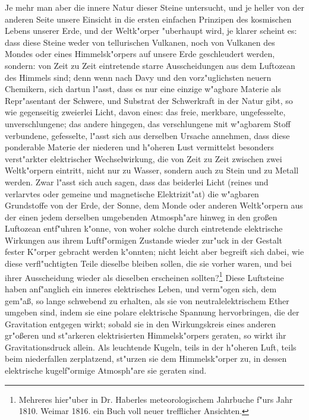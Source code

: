 \documentclass[a4paper, 11pt, oneside, polutonikogreek, german]{article}
\begin{document}
Je mehr man aber die innere Natur dieser Steine untersucht, und je heller von der anderen Seite unsere Einsicht in die ersten einfachen Prinzipen des kosmischen Lebens unserer Erde, und der Weltk"orper "uberhaupt wird, je klarer scheint es: dass diese Steine weder von tellurischen Vulkanen, noch von Vulkanen des Mondes oder eines Himmelsk"orpers auf unsere Erde geschleudert werden, sondern: von Zeit zu Zeit eintretende starre Ausscheidungen aus dem Luftozean des Himmels sind; denn wenn nach Davy und den vorz"uglichsten neuern Chemikern, sich dartun l"asst, dass es nur eine einzige w"agbare Materie als Repr"asentant der Schwere, und Substrat der Schwerkraft in der Natur gibt, so wie gegenseitig zweierlei Licht, davon eines: das freie, merkbare, ungefesselte, unverschlungene; das andere hingegen, das verschlungene mit w"agbarem Stoff verbundene, gefesselte, l"asst sich aus derselben Ursache annehmen, dass diese ponderable Materie der niederen und h"oheren Lust vermittelst besonders verst"arkter elektrischer Wechselwirkung, die von Zeit zu Zeit zwischen zwei Weltk"orpern eintritt, nicht nur zu Wasser, sondern auch zu Stein und zu Metall werden. Zwar l"asst sich auch sagen, dass das beiderlei Licht (reines und verlarvtes oder gemeine und magnetische Elektrizit"at) die w"agbaren Grundstoffe von der Erde, der Sonne, dem Monde oder anderen Weltk"orpern aus der einen jedem derselben umgebenden Atmosph"are hinweg in den großen Luftozean entf"uhren k"onne, von woher solche durch eintretende elektrische Wirkungen aus ihrem Luftf"ormigen Zustande wieder zur"uck in der Gestalt fester K"orper gebracht werden k"onnten; nicht leicht aber begreift sich dabei, wie diese verfl"uchtigten Teile dieselbe bleiben sollen, die sie vorher waren, und bei ihrer Ausscheidung wieder als dieselben erscheinen sollten?\footnote{Mehreres hier"uber in Dr. Haberles meteorologischem Jahrbuche f"urs Jahr 1810. Weimar 1816. ein Buch voll neuer trefflicher Ansichten.} Diese Luftsteine haben anf"anglich ein inneres elektrisches Leben, und verm"ogen sich, dem gem"aß, so lange schwebend zu erhalten, als sie von neutralelektrischem Ether umgeben sind, indem sie eine polare elektrische Spannung hervorbringen, die der Gravitation entgegen wirkt; sobald sie in den Wirkungskreis eines anderen gr"oßeren und st"arkeren elektrisierten Himmelsk"orpers geraten, so wirkt ihr Gravitationsdruck allein. Als leuchtende Kugeln, teils in der h"oheren Luft, teils beim niederfallen zerplatzend, st"urzen sie dem Himmelsk"orper zu, in dessen elektrische kugelf"ormige Atmosph"are sie geraten sind.
\end{document}
